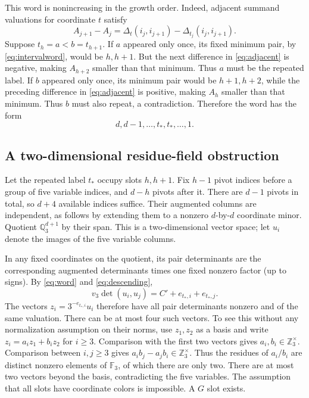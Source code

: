 \documentclass[11pt]{article}
\theoremstyle{definition}
\theoremstyle{remark}
\newcommand{\Z}{\mathbb Z}
\newcommand{\Q}{\mathbb Q}
\newcommand{\F}{\mathbb F}
\newcommand{\val}{v_3}
\begin{document}
This word is nonincreasing in the growth order. Indeed, adjacent
summand valuations for coordinate $t$ satisfy
\begin{equation}\label{eq:adjacent}
 A_{j+1}-A_j=
 \Delta_t(i_j,i_{j+1})-\Delta_{t_j}(i_j,i_{j+1}).
\end{equation}
Suppose $t_h=a<b=t_{h+1}$. If $a$ appeared only once, its fixed minimum
pair, by \eqref{eq:intervalword}, would be $h,h+1$. But the next
difference in \eqref{eq:adjacent} is negative, making $A_{h+2}$ smaller
than that minimum. Thus $a$ must be the repeated label. If $b$ appeared
only once, its minimum pair would be $h+1,h+2$, while the preceding
difference in \eqref{eq:adjacent} is positive, making $A_h$ smaller
than that minimum. Thus $b$ must also repeat, a contradiction.
Therefore the word has the form
\begin{equation}\label{eq:descending}
 d,d-1,\ldots,t_*,t_*,\ldots,1.
\end{equation}

\subsection{A two-dimensional residue-field obstruction}
Let the repeated label $t_*$ occupy slots $h,h+1$. Fix $h-1$ pivot
indices before a group of five variable indices, and $d-h$ pivots
after it. There are $d-1$ pivots in total, so $d+4$ available indices
suffice. Their augmented columns are independent, as follows by
extending them to a nonzero $d$-by-$d$ coordinate minor.
Quotient $\Q_3^{d+1}$ by their span. This is a two-dimensional vector
space; let $u_i$ denote the images of the five variable columns.

In any fixed coordinates on the quotient, its pair determinants are
the corresponding augmented determinants times one fixed nonzero
factor (up to signs). By \eqref{eq:word} and \eqref{eq:descending},
\[
 \val\det(u_i,u_j)=C'+e_{t_*,i}+e_{t_*,j}.
\]
The vectors $z_i=3^{-e_{t_*,i}}u_i$ therefore have all pair
determinants nonzero and of the same valuation. There can be at most
four such vectors. To see this without any normalization assumption on
their norms, use $z_1,z_2$ as a basis and write
$z_i=a_i z_1+b_i z_2$ for $i\ge3$. Comparison with the first two
vectors gives $a_i,b_i\in\Z_3^\times$. Comparison between $i,j\ge3$
gives $a_i b_j-a_j b_i\in\Z_3^\times$. Thus the residues of $a_i/b_i$
are distinct nonzero elements of $\F_3$, of which there are only two.
There are at most two vectors beyond the basis, contradicting the
five variables. The assumption that all slots have coordinate colors
is impossible. A $G$ slot exists.
\end{document}
